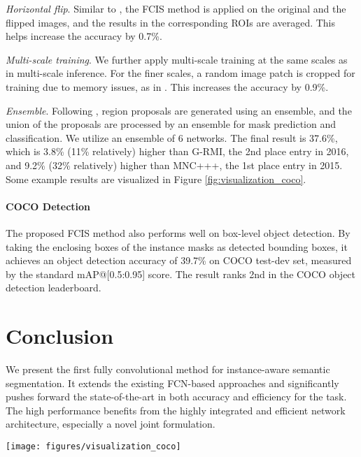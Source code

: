\documentclass[10pt,twocolumn,letterpaper]{article}
\begin{document}
\emph{Horizontal flip}. Similar to \cite{zagoruyko2016multipath}, the FCIS method is applied on the original and the flipped images, and the results in the corresponding ROIs are averaged. This helps increase the accuracy by 0.7\%. 

\emph{Multi-scale training}. We further apply multi-scale training at the same scales as in multi-scale inference. For the finer scales, a random  image patch is cropped for training due to memory issues, as in \cite{liu2016ssd}. This increases the accuracy by 0.9\%. 

\emph{Ensemble}. Following \cite{he2016deep}, region proposals are generated using an ensemble, and the union of the proposals are processed by an ensemble for mask prediction and classification. We utilize an ensemble of 6 networks. The final result is 37.6\%, which is 3.8\% (11\% relatively) higher than G-RMI, the 2nd place entry in 2016, and 9.2\% (32\% relatively) higher than MNC+++, the 1st place entry in 2015. Some example results are visualized in Figure \ref{fig:visualization_coco}.

\paragraph{COCO Detection} The proposed FCIS method also performs well on box-level object detection. By taking the enclosing boxes of the instance masks as detected bounding boxes, it achieves an object detection accuracy of 39.7\% on COCO test-dev set, measured by the standard mAP@[0.5:0.95] score. The result ranks 2nd in the COCO object detection leaderboard.

\section{Conclusion}
We present the first fully convolutional method for instance-aware semantic segmentation. It extends the existing FCN-based approaches and significantly pushes forward the state-of-the-art in both accuracy and efficiency for the task. The high performance benefits from the highly integrated and efficient network architecture, especially a novel joint formulation.


\begin{figure*}
\centering
\texttt{[image: figures/visualization\_coco]}
\caption{Example instance-aware semantic segmentation results of the proposed FCIS method on COCO test set. Check \url{https://github.com/daijifeng001/TA-FCN} for example results on the first 5k images on COCO test set.}
\label{fig:visualization_coco}
\end{figure*}



{\small


}
\end{document}
